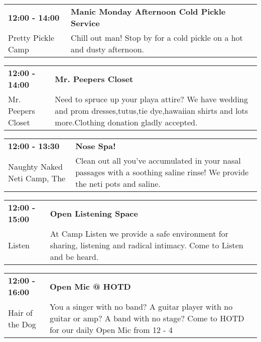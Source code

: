 \begin{tabular}{ p{1in} p{2.2in} }
    \textbf{12:00 - 14:00} & \textbf{Manic Monday Afternoon Cold Pickle Service} \\
    Pretty Pickle Camp \newline  & Chill out man! Stop by for a cold pickle on a hot and dusty afternoon. \\
    \hline 
\end{tabular}
    
\begin{tabular}{ p{1in} p{2.2in} }
    \textbf{12:00 - 14:00} & \textbf{Mr. Peepers Closet} \\
    Mr. Peepers Closet \newline  & Need to spruce up your playa attire? We have wedding and prom dresses,tutus,tie dye,hawaiian shirts and lots more.Clothing donation gladly accepted. \\
    \hline 
\end{tabular}
    
\begin{tabular}{ p{1in} p{2.2in} }
    \textbf{12:00 - 13:30} & \textbf{Nose Spa! } \\
    Naughty Naked Neti Camp, The \newline  & Clean out all you've accumulated in your nasal passages with a soothing saline rinse! We provide the neti pots and saline. \\
    \hline 
\end{tabular}
    
\begin{tabular}{ p{1in} p{2.2in} }
    \textbf{12:00 - 15:00} & \textbf{Open Listening Space} \\
    Listen \newline  & At Camp Listen we provide a safe environment for sharing, listening and radical intimacy. Come to Listen and be heard. \\
    \hline 
\end{tabular}
    
\begin{tabular}{ p{1in} p{2.2in} }
    \textbf{12:00 - 16:00} & \textbf{Open Mic @ HOTD} \\
    Hair of the Dog \newline  & You a singer with no band?  A guitar player with no guitar or amp? A band with no stage? Come to HOTD for our daily Open Mic from 12 - 4 \\
    \hline 
\end{tabular}
    
